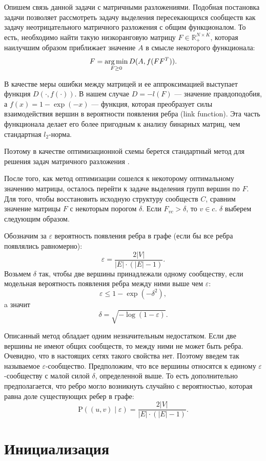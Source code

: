 \documentclass{ITaSconf}
\newcommand{\argmin}{\mathop{\rm arg\,min}\limits}
\def\PP{\mathrm{P}}
\begin{document}
	Опишем связь данной задачи с матричными разложениями.
	Подобная постановка задачи позволяет рассмотреть задачу выделения пересекающихся сообществ как задачу неотрицательного матричного разложения с общим функционалом.
	То есть, необходимо найти такую низкоранговую матрицу $F\in \mathbb{R}_{+}^{N \times K}$, которая наилучшим образом приближает значение $A$ в смысле некоторого функционала:
	$$ F = \argmin_{F\ge 0} D(A, f(F F^T)).$$
	
	В качестве меры ошибки между матрицей и ее аппроксимацией выступает функция $D(\cdot, f(\cdot))$.
	В нашем случае
	$D = -l(F)$ --- значение правдоподобия, а $f(x) = 1 - \exp(-x)$ --- функция, которая преобразует силы взаимодействия вершин в вероятности появления ребра (link function).
	Эта часть функционала делает его более пригодным к анализу бинарных матриц, чем стандартная $l_2$-норма.
	
	Поэтому в качестве оптимизационной схемы берется стандартный метод для решения задач матричного разложения \cite{lin2007projected}.
	
	После того, как метод оптимизации сошелся к некоторому оптимальному значению матрицы, осталось перейти к задаче выделения групп вершин по $F$.
	Для того, чтобы восстановить исходную структуру сообществ $C$, сравним значение матрицы $F$ с некоторым порогом $\delta$.
	Если $F_{vc} > \delta$, то $v \in c$.
	$\delta$ выберем следующим образом.
	
	Обозначим за $\varepsilon$ вероятность появления ребра в графе (если бы все ребра появлялись равномерно): 
	$$\varepsilon = \dfrac{2|V|}{|E|\cdot (|E|-1)}.$$ 
	Возьмем $\delta$ так, чтобы две вершины принадлежали одному сообществу, если модельная вероятность появления ребра между ними выше чем $\varepsilon$:
	$$\varepsilon \le 1-\exp(-\delta^2),$$
	a значит
	$$\delta = \sqrt{-\log(1-\varepsilon)}.$$
	
	Описанный метод обладает одним незначительным недостатком.
	Если две вершины не имеют общих сообществ, то между ними не может быть ребра.
	Очевидно, что в настоящих сетях такого свойства нет.
	Поэтому введем так называемое $\varepsilon$-сообщество.
	Предположим, что все вершины относятся к единому $\varepsilon$-сообществу с малой силой $\delta$, определенной выше.
	То есть дополнительно предполагается, что ребро могло возникнуть случайно с вероятностью, которая равна доле существующих ребер в графе:
	$$ \PP((u,v)\mid \varepsilon) = \dfrac{2|V|}{|E| \cdot \left( |E| - 1 \right)}.$$
	
	\section{Инициализация}
	
\end{document}
